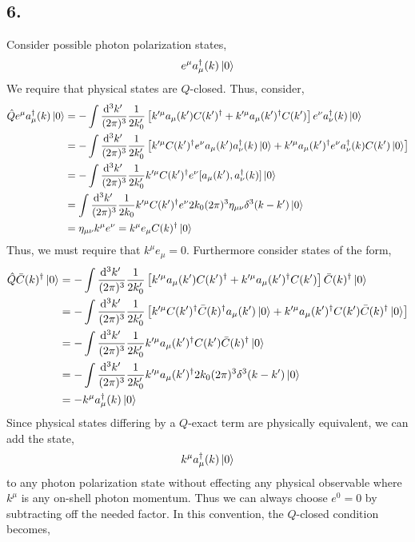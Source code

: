 \documentclass[12pt]{article}
\begin{document}
\subsection*{6.}

Consider possible photon polarization states,
\[ e^\mu a^\dagger_\mu(k) \left| 0 \right> \]
We require that physical states are $Q$-closed. Thus, consider, 
\begin{align*}
\hat{Q} e^\mu a^\dagger_\mu(k) \left| 0 \right> & = - \int \frac{\mathrm{d}^{3} k' \:}{(2 \pi)^3} \frac{1}{2 k_0'}  \left[ k'^\mu a_\mu(k') C(k')^\dagger + k'^\mu a_\mu(k')^\dagger C(k') \right] e^\nu a^\dagger_\nu(k) \left| 0 \right> 
\\
& = - \int \frac{\mathrm{d}^{3} k' \:}{(2 \pi)^3} \frac{1}{2 k_0'}  \left[ k'^\mu  C(k')^\dagger e^\nu a_\mu(k') a^\dagger_\nu(k)  \left| 0 \right> + k'^\mu a_\mu(k')^\dagger  e^\nu a^\dagger_\nu(k)  C(k') \left| 0 \right> \right]
\\
& = - \int \frac{\mathrm{d}^{3} k' \:}{(2 \pi)^3} \frac{1}{2 k_0'}  k'^\mu  C(k')^\dagger e^\nu [a_\mu(k'), a^\dagger_\nu(k)] \left| 0 \right> 
\\
& = \int \frac{\mathrm{d}^{3} k' \:}{(2 \pi)^3} \frac{1}{2 k_0}  k'^\mu  C(k')^\dagger e^\nu 2 k_0 (2 \pi)^3 \eta_{\mu\nu} \delta^3(k - k') \left| 0 \right>
\\
& = \eta_{\mu \nu} k^\mu e^\nu = k^\mu e_\mu C(k)^\dagger \left| 0 \right>
\end{align*}
Thus, we must require that $k^\mu e_\mu = 0$. Furthermore consider states of the form,
\begin{align*}
\hat{Q} \bar{C}(k)^\dagger \left| 0 \right> & = - \int \frac{\mathrm{d}^{3} k' \:}{(2 \pi)^3} \frac{1}{2 k_0'}  \left[ k'^\mu a_\mu(k') C(k')^\dagger + k'^\mu a_\mu(k')^\dagger C(k') \right] \bar{C}(k)^\dagger \left| 0 \right>
\\
& = - \int \frac{\mathrm{d}^{3} k' \:}{(2 \pi)^3} \frac{1}{2 k_0'}  \left[ k'^\mu  C(k')^\dagger \bar{C}(k)^\dagger a_\mu(k') \left| 0 \right> + k'^\mu a_\mu(k')^\dagger C(k') \bar{C}(k)^\dagger \left| 0 \right> \right] 
\\
& = - \int \frac{\mathrm{d}^{3} k' \:}{(2 \pi)^3} \frac{1}{2 k_0'}  k'^\mu a_\mu(k')^\dagger C(k') \bar{C}(k)^\dagger \left| 0 \right>  
\\
& = - \int \frac{\mathrm{d}^{3} k' \:}{(2 \pi)^3} \frac{1}{2 k_0'}  k'^\mu a_\mu(k')^\dagger 2 k_0 (2 \pi)^3 \delta^3(k - k') \left| 0 \right>
\\
& = - k^\mu a^\dagger_\mu(k) \left| 0 \right>
\end{align*}
Since physical states differing by a $Q$-exact term are physically equivalent, we can add the state,
\[ k^\mu a^\dagger_\mu(k) \left| 0 \right> \]
to any photon polarization state without effecting any physical observable where $k^\mu$ is any on-shell photon momentum. Thus we can always choose $e^0 = 0$ by subtracting off the needed factor. In this convention, the $Q$-closed condition becomes,
\end{document}
